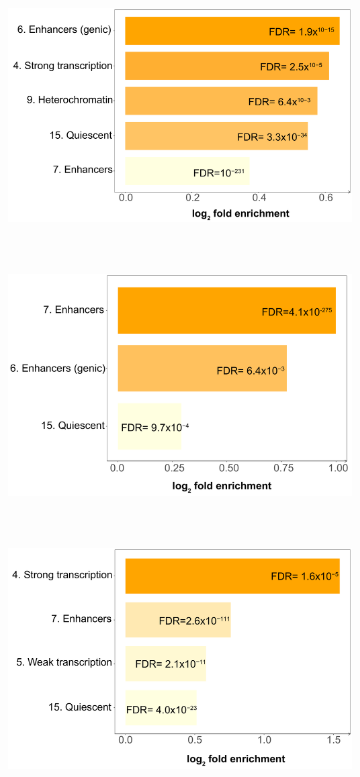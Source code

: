 \begin{figure}[H]
\centering
\begin{subfigure}[b]{0.40\textwidth}
\centering 
\includegraphics[width=\textwidth]{./Appendix/pdfs/Chapter5/ATAC_PSA_DAR_monocytes_chromatin_segments_enrichment_fc}
\caption{}
\end{subfigure}
~
\begin{subfigure}[b]{0.40\textwidth}
\centering 
\includegraphics[width=\textwidth]{./Appendix/pdfs/Chapter5/ATAC_PSA_DAR_CD4_chromatin_segments_enrichment_fc}
\caption{}
\end{subfigure}
~
\begin{subfigure}[b]{0.40\textwidth} 
\centering
\includegraphics[width=\textwidth]{./Appendix/pdfs/Chapter5/ATAC_PSA_DAR_CD8_chromatin_segments_enrichment_fc}%

\end{subfigure}
\end{figure}
